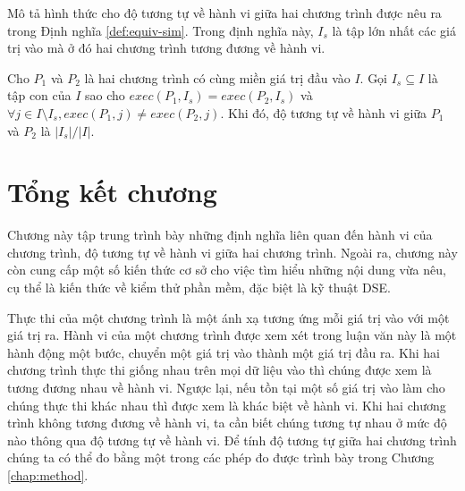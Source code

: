 Mô tả hình thức cho độ tương tự về hành vi giữa hai chương trình được
nêu ra trong Định nghĩa \ref{def:equiv-sim}. Trong định nghĩa này,
$I_s$ là tập lớn nhất các giá trị vào mà ở đó hai chương trình tương
đương về hành vi.
    
\begin{definition}
  \label{def:equiv-sim}
  Cho $P_{1}$ và $P_{2}$ là hai chương trình có cùng miền giá trị đầu
  vào $I$. Gọi $I_{s} \subseteq I$ là tập con của $I$ sao cho
  $exec(P_{1}, I_{s}) = exec(P_{2}, I_{s})$ và
  $\forall j \in I \setminus I_{s}, exec(P_{1}, j) \neq exec(P_{2},
  j)$. Khi đó, độ tương tự về hành vi giữa $P_1$ và $P_2$ là $|I_s|/|I|$.
\end{definition}

\section*{Tổng kết chương}
 
Chương này tập trung trình bày những định nghĩa liên quan đến hành vi 
của chương trình, độ tương tự về hành vi giữa hai chương trình. 
Ngoài ra, chương này còn cung cấp một số kiến thức cơ sở cho việc 
tìm hiểu những nội dung vừa nêu, cụ thể là kiến thức về kiểm thử phần mềm, 
đặc biệt là kỹ thuật DSE.
 
Thực thi của một chương trình là một ánh xạ tương ứng mỗi giá trị vào
với một giá trị ra. Hành vi của một chương trình được xem xét trong
luận văn này là một hành động một bước, chuyển một giá trị vào thành
một giá trị đầu ra. Khi hai chương trình thực thi giống nhau trên mọi
dữ liệu vào thì chúng được xem là tương đương nhau về hành vi. Ngược
lại, nếu tồn tại một số giá trị vào làm cho chúng thực thi khác nhau
thì được xem là khác biệt về hành vi. Khi hai chương trình không tương
đương về hành vi, ta cần biết chúng tương tự nhau ở mức độ nào thông
qua độ tương tự về hành vi. Để tính độ tương tự giữa hai chương trình
chúng ta có thể đo bằng một trong các phép đo được trình bày trong 
Chương \ref{chap:method}.